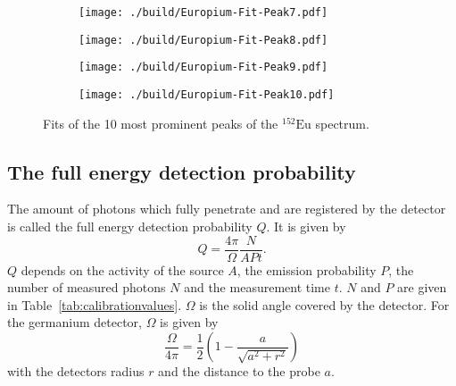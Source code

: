 \begin{figure}[H]
	\begin{adjustbox}{width=1.3\textwidth, center}
		\begin{subfigure}{.5\textwidth}
			\centering
			\texttt{[image: ./build/Europium-Fit-Peak7.pdf]}
		\end{subfigure}%
		\begin{subfigure}{.5\textwidth}
			\centering
			\texttt{[image: ./build/Europium-Fit-Peak8.pdf]}
		\end{subfigure}
	\end{adjustbox}
	\begin{adjustbox}{width=1.3\textwidth, center}
		\begin{subfigure}{.5\textwidth}
			\centering
			\texttt{[image: ./build/Europium-Fit-Peak9.pdf]}
		\end{subfigure}%
		\begin{subfigure}{.5\textwidth}
			\centering
			\texttt{[image: ./build/Europium-Fit-Peak10.pdf]}
		\end{subfigure}
	\end{adjustbox}
	\caption{Fits of the 10 most prominent peaks of the $^{152}\text{Eu}$ spectrum.}
\end{figure}
\FloatBarrier


\subsection{The full energy detection probability}
\label{sec:fullenergy}
The amount of photons which fully penetrate and are registered by the detector is called the full energy
detection probability $Q$. It is given by
\begin{equation}
	Q = \frac{4 \pi}{\Omega}\frac{N}{APt}.
	\label{eqn:fullenergy}
\end{equation}
$Q$ depends on the activity of the source $A$, the emission probability $P$, the number of measured photons $N$ and
the measurement time $t$. $N$ and $P$ are given in
Table~\ref{tab:calibrationvalues}. $\Omega$ is the solid angle covered by the
detector. For the germanium detector, $\Omega$ is given by
\begin{equation}
	\frac{\Omega}{4 \pi} = \frac{1}{2} \left( 1 - \frac{a}{\sqrt{a^{2} + r^{2}}} \right)
	\label{eqn:solidangle}
\end{equation}
with the detectors radius $r$ and the distance to the probe $a$.

